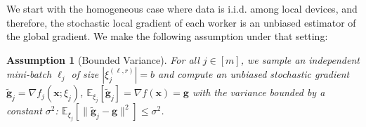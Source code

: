 \documentclass[sigconf, anonymous, review]{acmart}
\newtheorem{assumption}{Assumption}
\begin{document}
We start with the homogeneous case where data is i.i.d. among local devices, and therefore, the stochastic local gradient of each worker is an unbiased estimator of the global gradient.
We make the following assumption under that setting:
\begin{assumption}[Bounded Variance]\label{Assu:1.5}
For all $j\in [m]$, we  sample an independent mini-batch $\ell_j$ of size $|\xi_j^{(\ell,r)}| = b$ and compute an unbiased stochastic gradient  $\tilde{\mathbf{g}}_j = \nabla f_j(\boldsymbol{x}; \xi_j)$, $\mathbb{E}_{\xi_j}[\tilde{\mathbf{g}}_j] = \nabla f(\boldsymbol{x})=\mathbf{g}$ with the variance bounded by a constant $\sigma^2$: $\mathbb{E}_{\xi_j}\left[\|\tilde{\mathbf{g}}_j-\mathbf{g}\|^2\right]\leq \sigma^2$.
\end{assumption}
\end{document}
